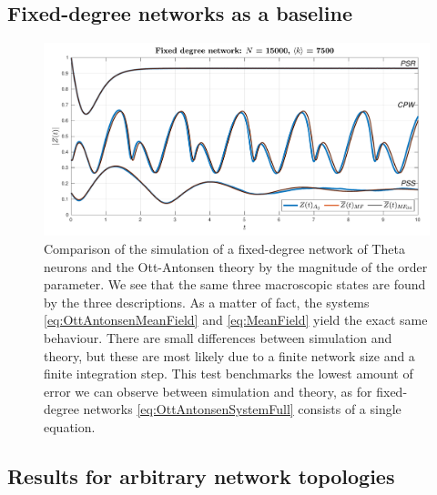 \subsection{Fixed-degree networks as a baseline}
\begin{figure}[ht]
\centering
\includegraphics[width = \textwidth]{../Figures/InspectMeanFieldFixedDegree.pdf}
\caption{Comparison of the simulation of a fixed-degree network of Theta neurons and the Ott-Antonsen theory by the magnitude of the order parameter. We see that the same three macroscopic states are found by the three descriptions. As a matter of fact, the systems \eqref{eq:OttAntonsenMeanField} and \eqref{eq:MeanField} yield the exact same behaviour. There are small differences between simulation and theory, but these are most likely due to a finite network size and a finite integration step. This test benchmarks the lowest amount of error we can observe between simulation and theory, as for fixed-degree networks \eqref{eq:OttAntonsenSystemFull} consists of a single equation.}
\label{fig:InspectMeanFieldFixedDegree}
\end{figure}


\subsection{Results for arbitrary network topologies}

